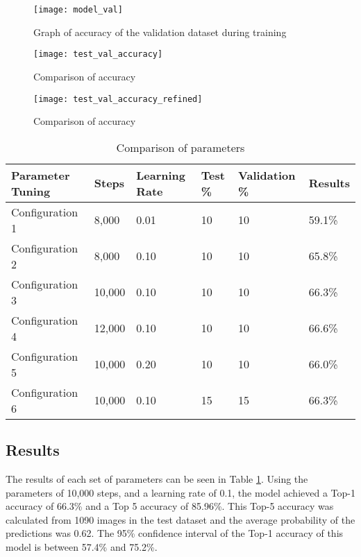 \begin{figure}[h]
    \texttt{[image: model\_val]}
     \caption{Graph of accuracy of the validation dataset during training}
     \label{fig:model_train_val}
\end{figure}

\begin{figure}[h]
    \texttt{[image: test\_val\_accuracy]}
     \caption{Comparison of accuracy}
     \label{fig:test_val_accuracy}
\end{figure}

\begin{figure}[h]
    \texttt{[image: test\_val\_accuracy\_refined]}
     \caption{Comparison of accuracy}
     \label{fig:test_val_accuracy_refined}
\end{figure}


\begin{table}[]
	\centering
	\caption{Comparison of parameters}
	\label{parameter_tuning_table}
	\begin{tabular}{|p{3cm}|l|l|l|l|l|}
  \hline
		\textbf{Parameter Tuning} & \textbf{Steps} & \textbf{Learning Rate} & \textbf{Test} \% & \textbf{Validation} \% &
		\textbf{Results} \\ \hline
		Configuration 1  & 8,000  & 0.01       & 10 & 10       &
		59.1\%  \\ \hline
		Configuration 2  & 8,000  & 0.10           & 10 & 10       &
		65.8\%  \\ \hline
		Configuration 3  & 10,000 & 0.10           & 10 & 10       &
		66.3\%  \\ \hline
		Configuration 4  & 12,000 & 0.10           & 10 & 10       &
		66.6\%  \\ \hline
		Configuration 5  & 10,000 & 0.20           & 10 & 10       &
		66.0\%  \\ \hline
		Configuration 6  & 10,000 & 0.10           & 15      & 15            &
		66.3\%  \\ \hline
	\end{tabular}
\end{table}

\tocless\subsection{Results}
The results of each set of parameters can be seen in Table
\ref{parameter_tuning_table}.
Using the parameters of 10,000 steps, and a learning rate of 0.1, the model achieved a Top-1 accuracy of 66.3\% and a Top 5 accuracy of 85.96\%.
This Top-5 accuracy was calculated from 1090 images in the test dataset and the average probability of the predictions was 0.62.
The 95\% confidence interval of the Top-1 accuracy of this model is between 57.4\% and 75.2\%.


